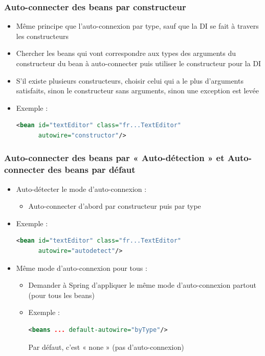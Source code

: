 \documentclass{beamer}
\begin{document}
\begin{frame}[fragile]
  \frametitle{Auto-connecter des beans par constructeur}
  \begin{itemize}
  \item Même principe que l'auto-connexion par type, sauf que la DI
se fait à travers les constructeurs
\item Chercher les beans qui vont correspondre aux types
des arguments du constructeur du bean à auto-connecter
puis utiliser le constructeur pour la DI
\item S'il existe plusieurs constructeurs, choisir celui qui a le plus
d'arguments satisfaits, sinon le constructeur sans arguments, sinon
une exception est levée
\item Exemple :
\begin{lstlisting}[language=XML,basicstyle=\scriptsize]    
<bean id="textEditor" class="fr...TextEditor"
      autowire="constructor"/>
\end{lstlisting}
  \end{itemize}
\end{frame}

\begin{frame}[fragile]
  \frametitle{Auto-connecter des beans par « Auto-détection »
et Auto-connecter des beans par défaut}
  \begin{itemize}
  \item Auto-détecter le mode d'auto-connexion :
  \begin{itemize}
  \item Auto-connecter d'abord par constructeur puis par type
  \end{itemize}
\item Exemple :
\begin{lstlisting}[language=XML,basicstyle=\scriptsize]    
<bean id="textEditor" class="fr...TextEditor"
      autowire="autodetect"/>
\end{lstlisting}

\item Même mode d'auto-connexion pour tous :
  \begin{itemize}
  \item Demander à Spring d'appliquer le même mode d'auto-connexion
partout (pour tous les beans)
\item Exemple :
\begin{lstlisting}[language=XML,basicstyle=\scriptsize]      
<beans ... default-autowire="byType"/>
\end{lstlisting}
Par défaut, c'est « none » (pas d'auto-connexion)
  \end{itemize}
  \end{itemize}
\end{frame}
\end{document}
